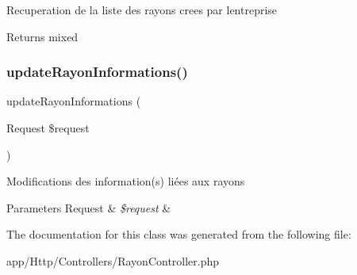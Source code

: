 Recuperation de la liste des rayons crees par l\textquotesingle{}entreprise \begin{DoxyReturn}{Returns}
mixed 
\end{DoxyReturn}
\mbox{\label{class_app_1_1_http_1_1_controllers_1_1_rayon_controller_a2f62ff6e10dcee45b50db2e170b4ae5d}} 
\subsubsection{\texorpdfstring{update\+Rayon\+Informations()}{updateRayonInformations()}}
{\footnotesize\ttfamily update\+Rayon\+Informations (\begin{DoxyParamCaption}\item[{Request}]{\$request }\end{DoxyParamCaption})}

Modifications des information(s) liées aux rayons 
\begin{DoxyParams}[1]{Parameters}
Request & {\em \$request} & \\
\hline
\end{DoxyParams}


The documentation for this class was generated from the following file\+:\begin{DoxyCompactItemize}
\item 
app/\+Http/\+Controllers/Rayon\+Controller.\+php\end{DoxyCompactItemize}
